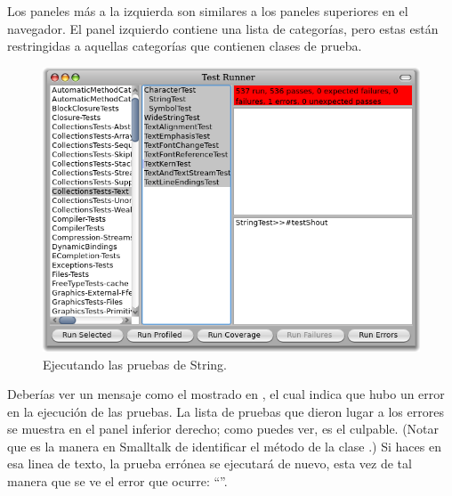 \documentclass[a4paper,10pt,twoside]{book}
\begin{document}
Los paneles m\'as a la izquierda son similares a los paneles superiores en el navegador. El panel izquierdo contiene una lista de categor\'ias, pero estas est\'an restringidas a aquellas categor\'ias que contienen clases de prueba.


\begin{figure}[hbt]
\centerline {\includegraphics[width=\textwidth]{testRunnerOnStringTest}}
\caption{Ejecutando las pruebas de String.
}
\end{figure}

Deber\'ias ver un mensaje como el mostrado en , el cual indica que hubo un error en la ejecuci\'on de las pruebas. La lista de pruebas que dieron lugar a los errores se muestra en el panel inferior derecho; como puedes ver,  es el culpable.
(Notar que  es la manera en Smalltalk de identificar el m\'etodo  de la clase .)
Si haces \click en esa linea de texto, la prueba err\'onea se ejecutar\'a de nuevo, esta vez de tal manera que se ve el error que ocurre: ``''.
\end{document}
